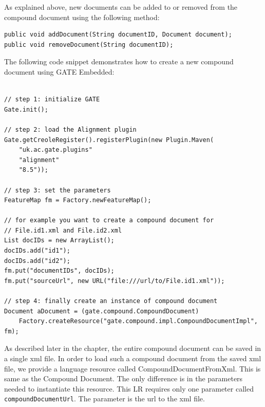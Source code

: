 As explained above, new documents can be added to or removed from the
compound document using the following method:

\begin{small}\begin{verbatim}
public void addDocument(String documentID, Document document);
public void removeDocument(String documentID);
\end{verbatim}\end{small}

The following code snippet demonstrates how to create a new compound document
using GATE Embedded:

\begin{lstlisting}

// step 1: initialize GATE 
Gate.init(); 
 
// step 2: load the Alignment plugin 
Gate.getCreoleRegister().registerPlugin(new Plugin.Maven(
    "uk.ac.gate.plugins"
    "alignment"
    "8.5"));
 
// step 3: set the parameters 
FeatureMap fm = Factory.newFeatureMap(); 
 
// for example you want to create a compound document for 
// File.id1.xml and File.id2.xml 
List docIDs = new ArrayList(); 
docIDs.add("id1"); 
docIDs.add("id2"); 
fm.put("documentIDs", docIDs); 
fm.put("sourceUrl", new URL("file:///url/to/File.id1.xml")); 
 
// step 4: finally create an instance of compound document 
Document aDocument = (gate.compound.CompoundDocument) 
    Factory.createResource("gate.compound.impl.CompoundDocumentImpl", fm);  
\end{lstlisting}


As described later in the chapter, the entire compound document can be saved
in a single xml file.  In order to load such a compound document from the saved
xml file, we provide a language resource called CompoundDocumentFromXml.  This
is same as the Compound Document.  The only difference is in the parameters 
needed to instantiate this resource.  This LR requires only one parameter called
{\tt compoundDocumentUrl}.  The parameter is the url to the xml file.


